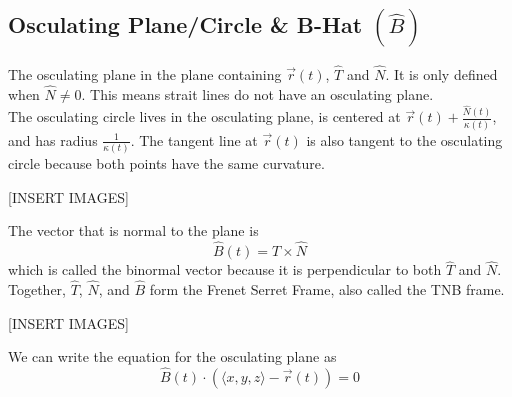 \subsection{Osculating Plane/Circle \& B-Hat $\left(\hat{B}\right)$}
\noindent
The osculating plane in the plane containing $\vec{r}(t)$, $\hat{T}$ and $\hat{N}$. It is only defined when $\hat{N}\neq 0$. This means strait lines do not have an osculating plane.\\

\noindent
The osculating circle lives in the osculating plane, is centered at $\vec{r}(t) + \frac{\hat{N}(t)}{\kappa(t)}$, and has radius $\frac{1}{\kappa(t)}$. The tangent line at $\vec{r}(t)$ is also tangent to the osculating circle because both points have the same curvature.

[INSERT IMAGES]

\noindent
The vector that is normal to the plane is 
\begin{equation*}
	\hat{B}(t) = \hat{T}\times\hat{N}
\end{equation*}
which is called the binormal vector because it is perpendicular to both $\hat{T}$ and $\hat{N}$. Together, $\hat{T}$, $\hat{N}$, and $\hat{B}$ form the Frenet Serret Frame, also called the TNB frame.

[INSERT IMAGES]

\noindent
We can write the equation for the osculating plane as
\begin{equation*}
	\hat{B}(t)\cdot\left(\langle x,y,z\rangle - \vec{r}(t)\right) = 0
\end{equation*}